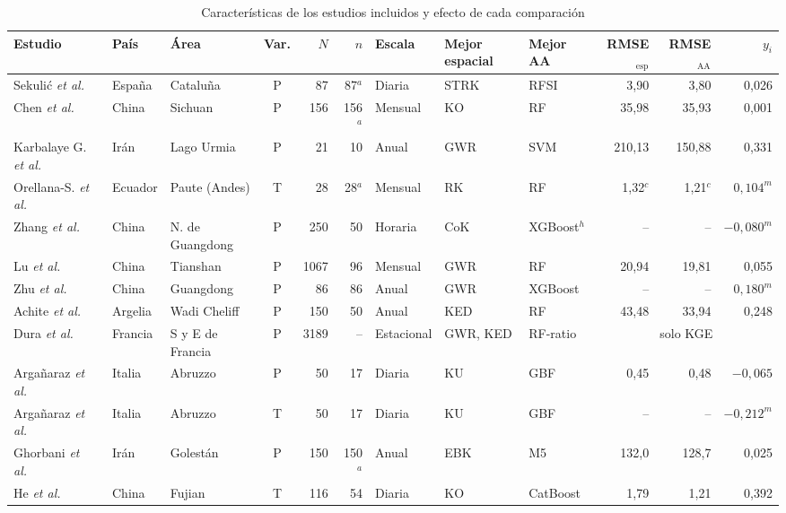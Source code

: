 \documentclass[conference]{IEEEtran}
\begin{document}
\begin{table}[!t]
\caption{Características de los estudios incluidos y efecto de cada comparación}
\label{tab:caract}
\centering
\scriptsize
\setlength{\tabcolsep}{3.2pt}
\renewcommand{\arraystretch}{1.08}
\begin{tabular}{@{}l l l c r r l l l r r r@{}}
\toprule
Estudio & País & Área & Var. & $N$ & $n$ & Escala & Mejor espacial & Mejor AA & RMSE$_{\mathrm{esp}}$ & RMSE$_{\mathrm{AA}}$ & $y_i$\\
\midrule
Sekulić \textit{et al.}~\cite{sekulic2020} & España & Cataluña & P & 87 & 87$^{a}$ & Diaria & STRK & RFSI & 3,90 & 3,80 & 0,026\\
Chen \textit{et al.}~\cite{chen2021} & China & Sichuan & P & 156 & 156$^{a}$ & Mensual & KO & RF & 35,98 & 35,93 & 0,001\\
Karbalaye G. \textit{et al.}~\cite{ghorbanpour2021} & Irán & Lago Urmia & P & 21 & 10 & Anual & GWR & SVM & 210,13 & 150,88 & 0,331\\
Orellana-S. \textit{et al.}~\cite{orellana2021} & Ecuador & Paute (Andes) & T & 28 & 28$^{a}$ & Mensual & RK & RF & 1,32$^{c}$ & 1,21$^{c}$ & $0{,}104^{m}$\\
Zhang \textit{et al.}~\cite{zhang2022} & China & N. de Guangdong & P & 250 & 50 & Horaria & CoK & XGBoost$^{h}$ & -- & -- & $-0{,}080^{m}$\\
Lu \textit{et al.}~\cite{lu2023} & China & Tianshan & P & 1067 & 96 & Mensual & GWR & RF & 20,94 & 19,81 & 0,055\\
Zhu \textit{et al.}~\cite{zhu2023} & China & Guangdong & P & 86 & 86 & Anual & GWR & XGBoost & -- & -- & $0{,}180^{m}$\\
Achite \textit{et al.}~\cite{achite2024} & Argelia & Wadi Cheliff & P & 150 & 50 & Anual & KED & RF & 43,48 & 33,94 & 0,248\\
Dura \textit{et al.}~\cite{dura2024} & Francia & S y E de Francia & P & 3189 & -- & Estacional & GWR, KED & RF-ratio & \multicolumn{3}{c}{solo KGE}\\
Argañaraz \textit{et al.}~\cite{arganaraz2025} & Italia & Abruzzo & P & 50 & 17 & Diaria & KU & GBF & 0,45 & 0,48 & $-0{,}065$\\
Argañaraz \textit{et al.}~\cite{arganaraz2025} & Italia & Abruzzo & T & 50 & 17 & Diaria & KU & GBF & -- & -- & $-0{,}212^{m}$\\
Ghorbani \textit{et al.}~\cite{ghorbani2025} & Irán & Golestán & P & 150 & 150$^{a}$ & Anual & EBK & M5 & 132,0 & 128,7 & 0,025\\
He \textit{et al.}~\cite{he2025} & China & Fujian & T & 116 & 54 & Diaria & KO & CatBoost & 1,79 & 1,21 & 0,392\\

\end{tabular}
\end{table}
\end{document}

